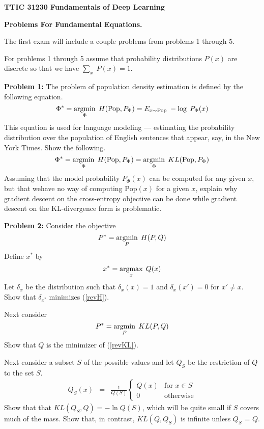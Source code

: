 \documentclass{article}
\begin{document}
\centerline{\bf TTIC 31230 Fundamentals of Deep Learning}
\centerline{\bf Problems For Fundamental Equations.}

\bigskip
\bigskip
The first exam will include a couple problems from problems 1 through 5.

\bigskip
For problems 1 through 5 assume that probability distributions $P(x)$ are discrete so that we have $\sum_x\;P(x) = 1$.

\bigskip
{\bf Problem 1:} The problem of population density estimation is defined by the following equation.
$$\Phi^* = \operatorname*{argmin}_\Phi\;H(\mathrm{Pop},P_\Phi) = E_{x \sim \mathrm{Pop}}\;-\log\;P_\Phi(x)$$
This equation is used for language modeling --- estimating the probability distribution over the population of English sentences that appear, say, in the New York Times.
Show the following.
$$\Phi^* = \operatorname*{argmin}_\Phi\;H(\mathrm{Pop},P_\Phi) = \operatorname*{argmin}_\Phi \;KL(\mathrm{Pop},P_\Phi)$$
Assuming that the model probability $P_\Phi(x)$ can be computed for any given $x$, but that wehave no way of computing $\mathrm{Pop}(x)$ for a given $x$,
explain why gradient descent on the cross-entropy objective
can be done while gradient descent on the KL-divergence form is problematic.


\bigskip
{\bf Problem 2:} Consider the objective
\begin{equation}
  \label{revH}
  P^* = \operatorname*{argmin}_P\;H(P,Q)
\end{equation}
Define $x^*$ by
$$x^* = \operatorname*{argmax}_x\;Q(x)$$
Let $\delta_x$ be the distribution such that $\delta_x(x) = 1$ and $\delta_x(x') = 0$ for $x' \not = x$.
Show that $\delta_{x^*}$ minimizes (\ref{revH}).

Next consider
\begin{equation}
  \label{revKL}
  P^* = \operatorname*{argmin}_P\;KL(P,Q)
\end{equation}
Show that $Q$ is the minimizer of (\ref{revKL}).

Next consider a subset $S$ of the possible values and let $Q_S$ be the restriction of $Q$ to the set $S$.
\begin{eqnarray*}
  Q_S(x) & = & \frac{1}{Q(S)}\left\{\begin{array}{ll} Q(x) & \mbox{for $x \in S$} \\ 0 & \mbox{otherwise} \end{array}\right.
\end{eqnarray*}
Show that that $KL(Q_S,Q) = -\ln Q(S)$, which will be quite small if $S$ covers much of the mass. Show that, in contrast, $KL(Q,Q_S)$ is infinite unless
$Q_S$ = $Q$.
\end{document}
